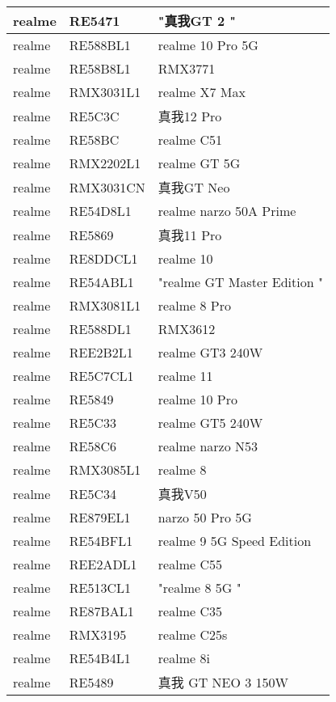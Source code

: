 \begin{tabularx}{\linewidth}{|l|X|X|}
        realme & RE5471 & "真我GT 2	" \\ \hline
        realme & RE588BL1 & realme 10 Pro 5G \\ \hline
        realme & RE58B8L1 & RMX3771 \\ \hline
        realme & RMX3031L1 & realme  X7 Max \\ \hline
        realme & RE5C3C & 真我12 Pro \\ \hline
        realme & RE58BC & realme C51 \\ \hline
        realme & RMX2202L1 & realme GT 5G \\ \hline
        realme & RMX3031CN & 真我GT Neo \\ \hline
        realme & RE54D8L1 & realme narzo 50A Prime \\ \hline
        realme & RE5869 & 真我11 Pro \\ \hline
        realme & RE8DDCL1 & realme 10 \\ \hline
        realme & RE54ABL1 & "realme GT Master Edition	" \\ \hline
        realme & RMX3081L1 & realme 8 Pro \\ \hline
        realme & RE588DL1 & RMX3612 \\ \hline
        realme & REE2B2L1 & realme GT3 240W \\ \hline
        realme & RE5C7CL1 & realme 11 \\ \hline
        realme & RE5849 & realme 10 Pro \\ \hline
        realme & RE5C33 & realme GT5 240W \\ \hline
        realme & RE58C6 & realme narzo N53 \\ \hline
        realme & RMX3085L1 & realme 8 \\ \hline
        realme & RE5C34 & 真我V50 \\ \hline
        realme & RE879EL1 & narzo 50 Pro 5G \\ \hline
        realme & RE54BFL1 & realme 9 5G Speed Edition \\ \hline
        realme & REE2ADL1 & realme C55 \\ \hline
        realme & RE513CL1 & "realme 8 5G	" \\ \hline
        realme & RE87BAL1 & realme C35 \\ \hline
        realme & RMX3195 & realme C25s \\ \hline
        realme & RE54B4L1 & realme 8i \\ \hline
        realme & RE5489 & 真我 GT NEO  3  150W \\ \hline

\end{tabularx}
